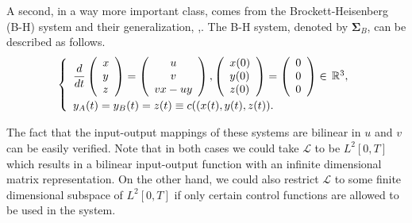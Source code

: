 \documentclass[12pt,onecolumn,draftcls]{IEEEtran}
\begin{document}
A second, in a way more important class, comes from the Brockett-Heisenberg (B-H) system and their generalization, \cite{rwb1},\cite{rwb2}.  The B-H system, denoted by ${\mathbf{\Sigma}}_B$,
can be described as follows. 
\begin{equation}
\left\{
\begin{array}{l}
\dfrac{d}{dt}\left( 
\begin{array}{l}
x\\y\\z
\end{array}
\right) = \left( 
\begin{array}{c}
u\\v\\vx-uy
\end{array}
\right) , \left( 
\begin{array}{l}
x(0)\\y(0)\\z(0)
\end{array}
\right)  =
\left( 
\begin{array}{l}
0\\0\\0
\end{array}
\right)  \in  \,\mathbb{R}^3,  \vspace{.1cm} \\
y_A(t)=y_B(t)=z(t) \equiv c((x(t),y(t),z(t)).
\end{array}
\right.
\label{eq:wong:BI}
\end{equation}

The fact that the input-output mappings of these systems are bilinear in $u$ and $v$ can be easily verified.  Note that in both cases we could take
$\mathcal{L}$ to be $L^2[0,T]$ which results in a bilinear
input-output function with an infinite dimensional matrix representation.
On the other hand, we could also restrict
$\mathcal{L}$ to some finite dimensional subspace of $L^2[0,T]$ if
only certain control functions are allowed to be used in the system.
\end{document}
